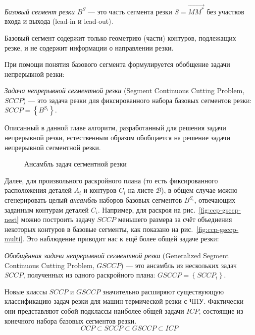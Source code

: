 \textit{Базовый сегмент резки}
$B^S$
---
это часть сегмента резки
$S = \overrightarrow{M M^*}$
без участков входа и выхода
(lead-in и lead-out).

Базовый сегмент содержит только геометрию
(части) контуров, подлежащих резке,
и не содержит информации о направлении резки.

При помощи понятия базового сегмента
формулируется обобщение задачи непрерывной резки:

\textit{Задача непрерывной сегментной резки}
(Segment Continuous Cutting Problem, $SCCP$)
--- это задача резки
для фиксированного набора базовых сегментов резки:
$SCCP = \left\{B^{S_i}\right\}$.

Описанный в данной главе алгоритм,
разработанный для решения задачи непрерывной резки,
естественным образом обобщается на решение
задачи непрерывной сегментной резки.

\begin{figure}
  \centering
  \caption{Ансамбль задач сегментной резки}
  \label{fig:ccp-gsccp}
\end{figure}

Далее, для произвольного раскройного плана
(то есть фиксированного расположения деталей $A_i$
и контуров $C_i$ на листе $\mathcal B$),
в общем случае можно сгенерировать целый
\textit{ансамбль}
наборов базовых сегментов $B^{S_i}$,
отвечающих заданным контурам деталей $C_i$.
Например,
для раскроя
на рис.~\ref{fig:ccp-gsccp-nest}
можно построить задачу $SCCP$
меньшего размера за счёт
объедиения некоторых контуров в базовые сегменты,
как показано на рис.~\ref{fig:ccp-gsccp-multi}.
Это наблюдение приводит нас к ещё более общей задаче резки:

\textit{Обобщённая задача непрерывной сегментной резки}
(Generalized Segment Continuous Cutting Problem, $GSCCP$)
--- это ансамбль из нескольких задач
$SCCP$,
полученных из одного раскройного плана:
$GSCCP = \left\{ SCCP_i \right\}$.

Новые классы
$SCCP$ и $GSCCP$
значительно расширяют существующую классификацию
задач резки для машин термической резки с ЧПУ.
Фактически они представляют собой подклассы
наиболее общей задачи $ICP$,
состоящие из конечного набора базовых сегментов резки.
$$
CCP \subset SCCP \subset GSCCP \subset ICP
$$

